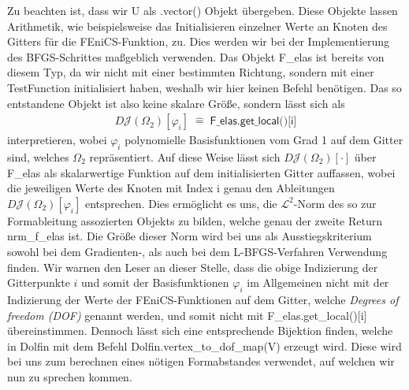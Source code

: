 Zu beachten ist, dass wir \textsf{U} als \textsf{.vector()} Objekt übergeben. Diese Objekte lassen Arithmetik, wie beispielsweise das Initialisieren einzelner Werte an Knoten des Gitters für die FEniCS-Funktion, zu. Dies werden wir bei der Implementierung des BFGS-Schrittes maßgeblich verwenden. Das Objekt \textsf{F\_elas} ist bereits von diesem Typ, da wir nicht mit einer bestimmten Richtung, sondern mit einer \textsf{TestFunction} initialisiert haben, weshalb wir hier keinen Befehl benötigen. Das so entstandene Objekt ist also keine skalare Größe, sondern lässt sich als
\begin{align}\label{felas}
	D\mathcal{J}(\Omega_2)[\varphi_i] \; \hat{=}\; \textsf{F\_elas.get\_local()[i]}
\end{align}
interpretieren, wobei $\varphi_i$ polynomielle Basisfunktionen vom Grad 1 auf dem Gitter sind, welches $\Omega_2$ repräsentiert. Auf diese Weise lässt sich $D\mathcal{J}(\Omega_2)[\cdot]$ über \textsf{F\_elas} als skalarwertige Funktion auf dem initialisierten Gitter auffassen, wobei die jeweiligen Werte des Knoten mit Index \textsf{i} genau den Ableitungen $D\mathcal{J}(\Omega_2)[\varphi_i]$ entsprechen. Dies ermöglicht es uns, die $\mathcal{L}^2$-Norm des so zur Formableitung assozierten Objekts zu bilden, welche genau der zweite Return \textsf{nrm\_f\_elas} ist. 
Die Größe dieser Norm wird bei uns als Ausstiegskriterium sowohl bei dem Gradienten-, als auch bei dem L-BFGS-Verfahren Verwendung finden.
Wir warnen den Leser an dieser Stelle, dass die obige Indizierung der Gitterpunkte $i$ und somit der Basisfunktionen $\varphi_i$ im Allgemeinen nicht mit der Indizierung der Werte der FEniCS-Funktionen auf dem Gitter, welche \textit{Degrees of freedom (DOF)} genannt werden, und somit nicht mit \textsf{F\_elas.get\_local()[i]} übereinstimmen. Dennoch lässt sich eine entsprechende Bijektion finden, welche in \textsf{Dolfin} mit dem Befehl \textsf{Dolfin.vertex\_to\_dof\_map(V)} erzeugt wird. Diese wird bei uns zum berechnen eines nötigen Formabstandes verwendet, auf welchen wir nun zu sprechen kommen.

